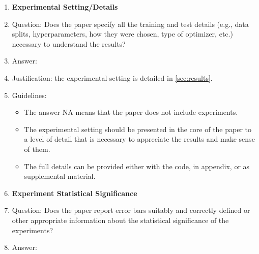 \documentclass{article}
\begin{document}
\begin{enumerate}
\item {\bf Experimental Setting/Details}
    \item[] Question: Does the paper specify all the training and test details (e.g., data splits, hyperparameters, how they were chosen, type of optimizer, etc.) necessary to understand the results?
    \item[] Answer: \answerYes{} %
    \item[] Justification: the experimental setting is detailed in \cref{sec:results}.
    \item[] Guidelines:
    \begin{itemize}
        \item The answer NA means that the paper does not include experiments.
        \item The experimental setting should be presented in the core of the paper to a level of detail that is necessary to appreciate the results and make sense of them.
        \item The full details can be provided either with the code, in appendix, or as supplemental material.
    \end{itemize}

\item {\bf Experiment Statistical Significance}
    \item[] Question: Does the paper report error bars suitably and correctly defined or other appropriate information about the statistical significance of the experiments?
    \item[] Answer: 
    

\end{enumerate}
\end{document}

